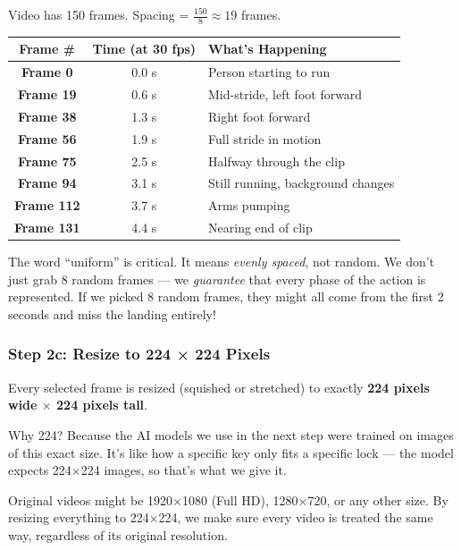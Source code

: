 \documentclass[12pt, a4paper]{article}
\begin{document}
\begin{examplebox}
Video has 150 frames. Spacing = $\frac{150}{8} \approx 19$ frames.
\begin{center}
\renewcommand{\arraystretch}{1.3}
\begin{tabular}{ccl}
\toprule
\textbf{Frame \#} & \textbf{Time (at 30 fps)} & \textbf{What's Happening} \\
\midrule
\textbf{Frame 0} & 0.0 s & Person starting to run \\
\textbf{Frame 19} & 0.6 s & Mid-stride, left foot forward \\
\textbf{Frame 38} & 1.3 s & Right foot forward \\
\textbf{Frame 56} & 1.9 s & Full stride in motion \\
\textbf{Frame 75} & 2.5 s & Halfway through the clip \\
\textbf{Frame 94} & 3.1 s & Still running, background changes \\
\textbf{Frame 112} & 3.7 s & Arms pumping \\
\textbf{Frame 131} & 4.4 s & Nearing end of clip \\
\bottomrule
\end{tabular}
\end{center}
\end{examplebox}

\begin{warnbox}
The word ``uniform'' is critical. It means \textit{evenly spaced}, not random. We don't just grab 8 random frames — we \textit{guarantee} that every phase of the action is represented. If we picked 8 random frames, they might all come from the first 2 seconds and miss the landing entirely!
\end{warnbox}

\subsubsection{Step 2c: Resize to 224 × 224 Pixels}

\begin{keybox}
Every selected frame is resized (squished or stretched) to exactly \textbf{224 pixels wide $\times$ 224 pixels tall}. 

Why 224? Because the AI models we use in the next step were trained on images of this exact size. It's like how a specific key only fits a specific lock — the model expects 224$\times$224 images, so that's what we give it.

Original videos might be 1920$\times$1080 (Full HD), 1280$\times$720, or any other size. By resizing everything to 224$\times$224, we make sure every video is treated the same way, regardless of its original resolution.
\end{keybox}
\end{document}
